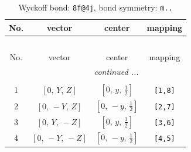 \documentclass[fleqn,8pt]{jsarticle}
\begin{document}
\renewcommand{\arraystretch}{1.2}
\begin{longtable}{cccc}
\caption{Wyckoff bond: {\tt 8f@4j}, bond symmetry: {\tt m..}}
 \\
 \hline \hline
No. & vector & center & mapping \\ \hline \endfirsthead

\multicolumn{3}{l}{\tablename\ \thetable{}} \\
 \hline \hline
No. & vector & center & mapping \\ \hline \endhead

 \hline \hline
\multicolumn{3}{r}{\footnotesize\it continued ...} \\ \endfoot

 \hline \hline
\multicolumn{3}{r}{} \\ \endlastfoot

1 & $\left[ 0,\, Y,\, Z \right]$ & $\left[ 0,\, y,\, \frac{1}{2} \right]$ & {\tt [1,8]} \\ \hline
2 & $\left[ 0,\, - Y,\, Z \right]$ & $\left[ 0,\, - y,\, \frac{1}{2} \right]$ & {\tt [2,7]} \\ \hline
3 & $\left[ 0,\, Y,\, - Z \right]$ & $\left[ 0,\, y,\, \frac{1}{2} \right]$ & {\tt [3,6]} \\ \hline
4 & $\left[ 0,\, - Y,\, - Z \right]$ & $\left[ 0,\, - y,\, \frac{1}{2} \right]$ & {\tt [4,5]} \\
\end{longtable}
\renewcommand{\arraystretch}{1.2}
\end{document}
